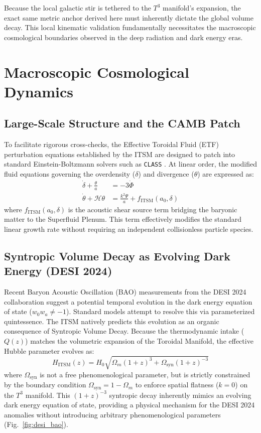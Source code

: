 \documentclass[aps,prd,10pt,twocolumn,superscriptaddress,nofootinbib,floatfix]{revtex4-2}
\begin{document}
Because the local galactic stir is tethered to the $T^3$ manifold's expansion, the exact same metric anchor derived here must inherently dictate the global volume decay. This local kinematic validation fundamentally necessitates the macroscopic cosmological boundaries observed in the deep radiation and dark energy eras.

\section{Macroscopic Cosmological Dynamics}

\subsection{Large-Scale Structure and the CAMB Patch}
To facilitate rigorous cross-checks, the Effective Toroidal Fluid (ETF) perturbation equations established by the ITSM are designed to patch into standard Einstein-Boltzmann solvers such as \texttt{CLASS} \cite{class_code}. At linear order, the modified fluid equations governing the overdensity ($\delta$) and divergence ($\theta$) are expressed as:
\begin{align}
\dot{\delta} + \frac{\theta}{a} &= -3\dot{\Phi} \\
\dot{\theta} + \mathcal{H}\theta &= \frac{k^2\Psi}{a} + f_{\text{ITSM}}(a_0, \delta)
\end{align}
where $f_{\text{ITSM}}(a_0, \delta)$ is the acoustic shear source term bridging the baryonic matter to the Superfluid Plenum. This term effectively modifies the standard linear growth rate without requiring an independent collisionless particle species.

\subsection{\label{sec:bao}Syntropic Volume Decay as Evolving Dark Energy (DESI 2024)}
Recent Baryon Acoustic Oscillation (BAO) measurements from the DESI 2024 collaboration \cite{desi} suggest a potential temporal evolution in the dark energy equation of state ($w_0w_a \neq -1$). Standard models attempt to resolve this via parameterized quintessence. The ITSM natively predicts this evolution as an organic consequence of Syntropic Volume Decay. Because the thermodynamic intake ($Q(z)$) matches the volumetric expansion of the Toroidal Manifold, the effective Hubble parameter evolves as:
\begin{equation}
H_{\text{ITSM}}(z) = H_0 \sqrt{\Omega_m(1+z)^3 + \Omega_{\text{syn}}(1+z)^{-3}}
\end{equation}
where $\Omega_{\text{syn}}$ is not a free phenomenological parameter, but is strictly constrained by the boundary condition $\Omega_{\text{syn}} = 1 - \Omega_m$ to enforce spatial flatness ($k=0$) on the $T^3$ manifold. This $(1+z)^{-3}$ syntropic decay inherently mimics an evolving dark energy equation of state, providing a physical mechanism for the DESI 2024 anomalies without introducing arbitrary phenomenological parameters (Fig.~\ref{fig:desi_bao}).
\end{document}

